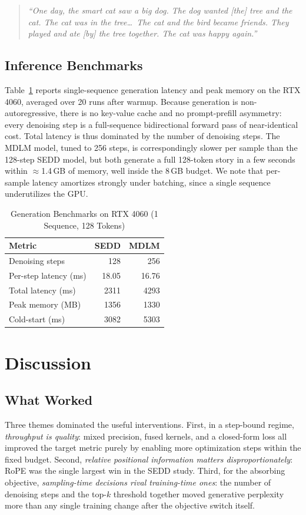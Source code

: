 \documentclass[conference]{IEEEtran}
\begin{document}
\begin{quote}\small\itshape
``One day, the smart cat saw a big dog. The dog wanted [the] tree and
the cat. The cat was in the tree\ldots\ The cat and the bird became
friends. They played and ate [by] the tree together. The cat was happy
again.''
\end{quote}

\subsection{Inference Benchmarks}
Table~\ref{tab:bench} reports single-sequence generation latency and
peak memory on the RTX 4060, averaged over 20 runs after warmup. Because
generation is non-autoregressive, there is no key-value cache and no
prompt-prefill asymmetry: every denoising step is a full-sequence
bidirectional forward pass of near-identical cost. Total latency is thus
dominated by the number of denoising steps. The MDLM model, tuned to
256 steps, is correspondingly slower per sample than the 128-step SEDD
model, but both generate a full 128-token story in a few seconds within
$\approx$1.4\,GB of memory, well inside the 8\,GB budget. We note that
per-sample latency amortizes strongly under batching, since a single
sequence underutilizes the GPU.

\begin{table}[t]
\caption{Generation Benchmarks on RTX 4060 (1 Sequence, 128 Tokens)}
\label{tab:bench}
\centering
\begin{tabular}{@{}lrr@{}}
\toprule
\textbf{Metric} & \textbf{SEDD} & \textbf{MDLM} \\
\midrule
Denoising steps & 128 & 256 \\
Per-step latency (ms) & 18.05 & 16.76 \\
Total latency (ms) & 2311 & 4293 \\
Peak memory (MB) & 1356 & 1330 \\
Cold-start (ms) & 3082 & 5303 \\
\bottomrule
\end{tabular}
\end{table}

\section{Discussion}

\subsection{What Worked}
Three themes dominated the useful interventions. First, in a step-bound
regime, \emph{throughput is quality}: mixed precision, fused kernels,
and a closed-form loss all improved the target metric purely by enabling
more optimization steps within the fixed budget. Second,
\emph{relative positional information matters disproportionately}: RoPE
was the single largest win in the SEDD study. Third, for the absorbing
objective, \emph{sampling-time decisions rival training-time ones}: the
number of denoising steps and the top-$k$ threshold together moved
generative perplexity more than any single training change after the
objective switch itself.
\end{document}
